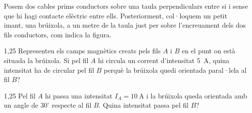 Posem dos cables prims conductors sobre una taula perpendiculars entre si i sense que hi hagi contacte elèctric entre ells. Posteriorment, col·loquem un petit imant, una brúixola, a un metre de la taula just per sobre l'encreuament dels dos fils conductors, com indica la figura.


\begin{apartat}{1,25}
Representeu els camps magnètics creats pels fils $A$ i $B$ en el punt on està situada la brúixola. Si pel fil $A$ hi circula un corrent d'intensitat 5~A, quina intensitat ha de circular pel fil $B$ perquè la brúixola quedi orientada paral·lela al fil $B$?
\end{apartat}

\begin{apartat}{1,25}
Pel fil $A$ hi passa una intensitat $I_A = 10\ \mathrm{A}$ i la brúixola queda orientada amb un angle de $30^\circ$ respecte al fil $B$. Quina intensitat passa pel fil $B$?
\end{apartat}
